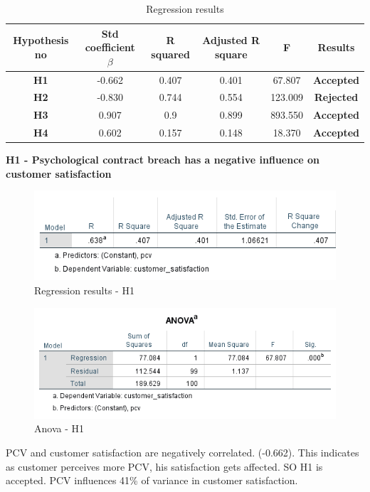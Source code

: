 \documentclass[a4paper, 12pt]{extarticle}
\begin{document}
{\begin{table}[H]
\centering
\begin{tabular}{|c|c|c|c|c|c|}
\hline
Hypothesis no & Std coefficient $\beta$  & R squared & Adjusted R square & F & Results \\
\hline
\textbf{H1} & -0.662 & 0.407 & 0.401 & 67.807 & \textbf{Accepted} \\
\hline
\textbf{H2} & -0.830 & 0.744 & 0.554 & 123.009 & \textbf{Rejected} \\
\hline
\textbf{H3} & 0.907 & 0.9 & 0.899 & 893.550 & \textbf{Accepted} \\
\hline
\textbf{H4} & 0.602 & 0.157 & 0.148 & 18.370 & \textbf{Accepted} \\
\hline 
\end{tabular}
\caption{Regression results}
\end{table}
\newpage
\par \textbf{H1 - Psychological contract breach has a negative influence on customer satisfaction}\\
\begin{figure}[H]
\centering
\includegraphics[scale=1]{pcv_vs_customer_satisfaction.png}
\caption{Regression results - H1}
\end{figure}

\begin{figure}[H]
\centering
\includegraphics[scale=1]{anova_pcv_cs.png}
\caption{Anova - H1}
\end{figure}

PCV and customer satisfaction are negatively correlated. (-0.662). This indicates as customer perceives more PCV, his satisfaction gets affected. SO H1 is accepted.
PCV influences 41\% of variance in customer satisfaction.\\

}
\end{document}
